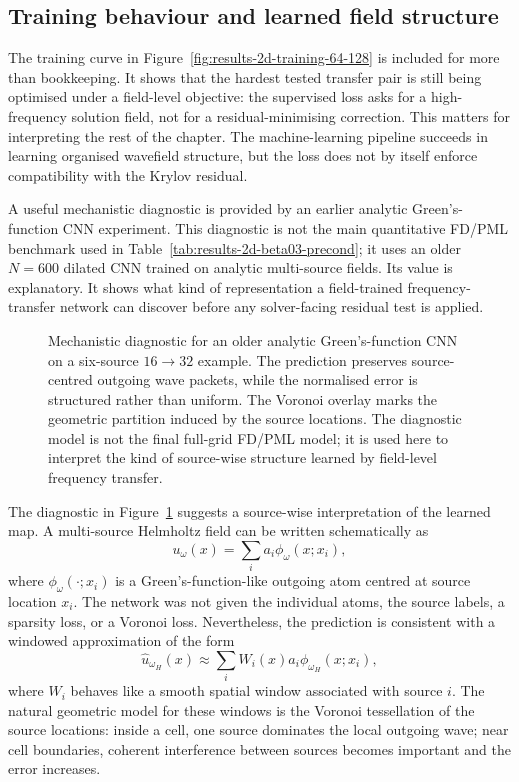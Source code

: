 \subsection{Training behaviour and learned field structure}
\label{subsec:results-2d-learned-structure}

The training curve in Figure~\ref{fig:results-2d-training-64-128} is included
for more than bookkeeping. It shows that the hardest tested transfer pair is
still being optimised under a field-level objective: the supervised loss asks
for a high-frequency solution field, not for a residual-minimising correction.
This matters for interpreting the rest of the chapter. The machine-learning
pipeline succeeds in learning organised wavefield structure, but the loss does
not by itself enforce compatibility with the Krylov residual.

A useful mechanistic diagnostic is provided by an earlier analytic
Green's-function CNN experiment. This diagnostic is not the main quantitative
FD/PML benchmark used in Table~\ref{tab:results-2d-beta03-precond}; it uses an
older $N=600$ dilated CNN trained on analytic multi-source fields. Its value is
explanatory. It shows what kind of representation a field-trained
frequency-transfer network can discover before any solver-facing residual
test is applied.

\begin{figure}[htbp]
    \centering
    \caption{Mechanistic diagnostic for an older analytic Green's-function
    CNN on a six-source $16\to32$ example. The prediction preserves
    source-centred outgoing wave packets, while the normalised error is
    structured rather than uniform. The Voronoi overlay marks the geometric
    partition induced by the source locations. The diagnostic model is not the
    final full-grid FD/PML model; it is used here to interpret the kind of
    source-wise structure learned by field-level frequency transfer.}
    \label{fig:results-voronoi-prediction}
\end{figure}

The diagnostic in Figure~\ref{fig:results-voronoi-prediction} suggests a
source-wise interpretation of the learned map. A multi-source Helmholtz field
can be written schematically as
\[
    u_\omega(x) = \sum_i a_i \phi_\omega(x;x_i),
\]
where $\phi_\omega(\cdot;x_i)$ is a Green's-function-like outgoing atom
centred at source location $x_i$. The network was not given the individual
atoms, the source labels, a sparsity loss, or a Voronoi loss. Nevertheless,
the prediction is consistent with a windowed approximation of the form
\[
    \widehat{u}_{\omega_H}(x)
    \approx
    \sum_i W_i(x) a_i \phi_{\omega_H}(x;x_i),
\]
where $W_i$ behaves like a smooth spatial window associated with source $i$.
The natural geometric model for these windows is the Voronoi tessellation of
the source locations: inside a cell, one source dominates the local outgoing
wave; near cell boundaries, coherent interference between sources becomes
important and the error increases.

